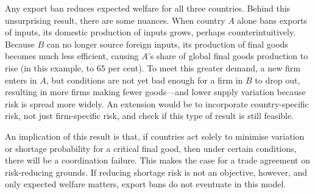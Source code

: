 \documentclass{article}
\begin{document}
Any export ban reduces expected welfare for all three countries. Behind this unsurprising result, there are some nuances. When country $A$ alone bans exports of inputs, its domestic production of inputs grows, perhaps counterintuitively. Because $B$ can no longer source foreign inputs, its production of final goods becomes much less efficient, causing $A$'s share of global final goods production to rise (in this example, to 65 per cent). To meet this greater demand, a new firm enters in $A$, but conditions are not yet bad enough for a firm in $B$ to drop out, resulting in more firms making fewer goods---and lower supply variation because risk is spread more widely. An extension would be to incorporate country-specific risk, not just firm-specific risk, and check if this type of result is still feasible.

An implication of this result is that, if countries act solely to minimise variation or shortage probability for a critical final good, then under certain conditions, there will be a coordination failure. This makes the case for a trade agreement on risk-reducing grounds. If reducing shortage risk is not an objective, however, and only expected welfare matters, export bans do not eventuate in this model.
\end{document}
